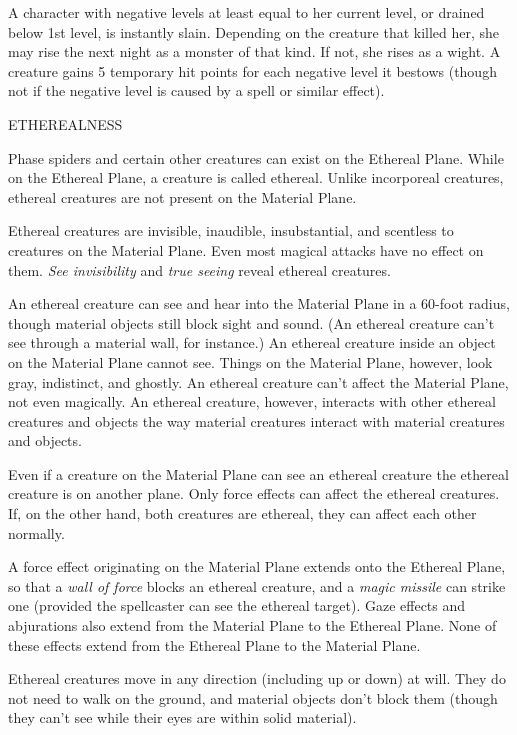 \documentclass{article}
\begin{document}
A character with negative levels at least equal to her current level, or drained 
below 1st level, is instantly slain. Depending on the creature that killed her, 
she may rise the next night as a monster of that kind. If not, she rises as a wight. 
A creature gains 5 temporary hit points for each negative level it bestows (though 
not if the negative level is caused by a spell or similar effect).

\vspace{12pt}
ETHEREALNESS

Phase spiders and certain other creatures can exist on the Ethereal Plane. While 
on the Ethereal Plane, a creature is called ethereal. Unlike incorporeal creatures, 
ethereal creatures are not present on the Material Plane.

Ethereal creatures are invisible, inaudible, insubstantial, and scentless to creatures 
on the Material Plane. Even most magical attacks have no effect on them. \textit{See 
invisibility }and \textit{true seeing }reveal ethereal creatures.

An ethereal creature can see and hear into the Material Plane in a 60-foot radius, 
though material objects still block sight and sound. (An ethereal creature can't 
see through a material wall, for instance.) An ethereal creature inside an object 
on the Material Plane cannot see. Things on the Material Plane, however, look gray, 
indistinct, and ghostly. An ethereal creature can't affect the Material Plane, 
not even magically. An ethereal creature, however, interacts with other ethereal 
creatures and objects the way material creatures interact with material creatures 
and objects.

Even if a creature on the Material Plane can see an ethereal creature the ethereal 
creature is on another plane. Only force effects can affect the ethereal creatures. 
If, on the other hand, both creatures are ethereal, they can affect each other 
normally.

A force effect originating on the Material Plane extends onto the Ethereal Plane, 
so that a \textit{wall of force }blocks an ethereal creature, and a \textit{magic 
missile }can strike one (provided the spellcaster can see the ethereal target). 
Gaze effects and abjurations also extend from the Material Plane to the Ethereal 
Plane. None of these effects extend from the Ethereal Plane to the Material Plane.

Ethereal creatures move in any direction (including up or down) at will. They do 
not need to walk on the ground, and material objects don't block them (though they 
can't see while their eyes are within solid material).
\end{document}
